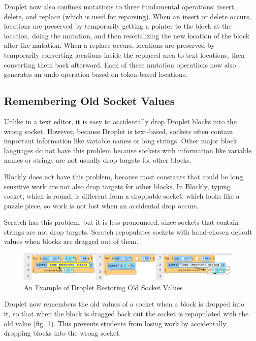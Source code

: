 \documentclass[conference]{IEEEtran}
\begin{document}
Droplet now also confines mutations to three fundamental operations: insert, delete, and replace (which is used for reparsing). When an insert or delete occurs, locations are preserved by temporarily getting a pointer to the block at the location, doing the mutation, and then reserializing the new location of the block after the mutation. When a replace occurs, locations are preserved by temporarily converting locations inside the replaced area to text locations, then converting them back afterward. Each of these mutation operations now also generates an undo operation based on token-based locations.

\subsection{Remembering Old Socket Values}

Unlike in a text editor, it is easy to accidentally drop Droplet blocks into the wrong socket. However, because Droplet is text-based, sockets often contain important information like variable names or long strings. Other major block languages do not have this problem because sockets with information like variable names or strings are not usually drop targets for other blocks.

Blockly does not have this problem, because most constants that could be long, sensitive work are not also drop targets for other blocks. In Blockly, typing socket, which is round, is different from a droppable socket, which looks like a puzzle piece, so work is not lost when an accidental drop occurs.

Scratch has this problem, but it is less pronounced, since sockets that contain strings are not drop targets. Scratch repopulates sockets with hand-chosen default values when blocks are dragged out of them.

\begin{figure}
\centering
\includegraphics[width=5in]{remember-socket.png}
\caption{An Example of Droplet Restoring Old Socket Values}
\label{remember-socket}
\end{figure}

Droplet now remembers the old values of a socket when a block is dropped into it, so that when the block is dragged back out the socket is repopulated with the old value (fig. \ref{remember-socket}). This prevents students from losing work by accidentally dropping blocks into the wrong socket.
\end{document}
